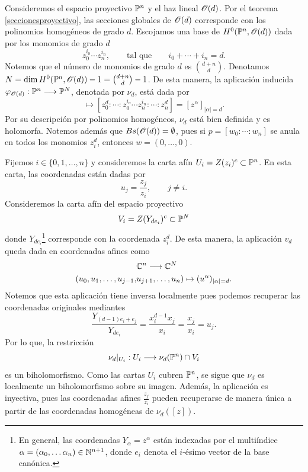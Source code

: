 	\begin{example}
		Consideremos el espacio proyectivo $\mathbb{P}^n$ y el haz lineal $\mathscr{O}(d)$. Por el teorema \ref{seccionesproyectivo}, las secciones globales de $\mathscr{O}(d)$ corresponde con los polinomios homogéneos de grado $d$. Escojamos una base de $H^0(\mathbb{P}^n,\mathscr{O}(d))$ dada por los monomios de grado $d$
		\begin{equation*}
			z_0^{i_0}\cdots z_n^{i_n},\qquad\text{tal que}\qquad i_0+\cdots+i_n=d.
		\end{equation*}
		Notemos que el número de monomios de grado $d$ es $\binom{d+n}{d}$. Denotamos $N=\dim H^0(\mathbb{P}^n,\mathscr{O}(d))-1=\binom{d+n}{d}-1$.
		De esta manera, la aplicación inducida $\varphi_{\mathscr{O}(d)}:\mathbb{P}^n\longrightarrow \mathbb{P}^N$, denotada por $\nu_d$, está dada por
		\begin{equation*}
			[z_0:\cdots:z_n]\mapsto [z_0^d:\cdots:z_0^{i_o}\cdots z_n^{i_n}:\cdots:z_n^d]=[z^\alpha]_{|\alpha|=d}.
		\end{equation*}
		Por su descripción por polinomios homogéneos, $\nu_d$ está bien definida y es holomorfa. 
		Notemos además que $Bs(\mathscr{O}(d))=\emptyset$, pues si $p=[w_0:\cdots:w_n]$ se anula en todos los monomios $z_i^d$, entonces $w=(0,\dots,0)$. 
		
		Fijemos $i\in\{0,1,\dots,n\}$ y consideremos la carta afín $U_i=Z(z_i)^c\subset \mathbb{P}^n$. En esta carta, las coordenadas están dadas por
		\begin{equation*}
			u_j=\frac{z_j}{z_i},\qquad j\neq i.
		\end{equation*}
		Consideremos la carta afín del espacio proyectivo 
		\begin{equation*}
			V_i=Z(Y_{de_i})^c\subset\mathbb{P}^N
		\end{equation*}
		donde $Y_{de_i}$\footnote{En general, las coordenadas $Y_\alpha=z^\alpha$ están indexadas por el multiíndice $\alpha=(\alpha_0,\dots \alpha_n)\in\mathbb{N}^{n+1}$, donde $e_i$ denota el $i$-ésimo vector de la base canónica.} corresponde con la coordenada $z_i^d$. De esta manera, la aplicación $v_d$ queda dada en coordenadas afines como
		\begin{align*}
			&\mathbb{C}^n\longrightarrow \mathbb{C}^N\\
			(u_0,u_1,\dots,u_{j-1},&u_{j+1},\dots,u_n)\mapsto (u^\alpha)_{|\alpha|=d}.
		\end{align*}
		Notemos que esta aplicación tiene inversa localmente pues podemos recuperar las coordenadas originales mediantes
		\begin{equation*}
			\frac{Y_{(d-1)e_i+e_j}}{Y_{de_i}}=\frac{x_i^{d-1}x_j}{x_i}=\frac{x_j}{x_i}=u_j.
		\end{equation*}
		Por lo que, la restricción
		\begin{equation*}
			\nu_d|_{U_i}:U_i\longrightarrow \nu_d(\mathbb{P}^n)\cap V_i
		\end{equation*}
		es un biholomorfismo. 
		Como las cartas $U_i$ cubren $\mathbb{P}^n$, se sigue que $\nu_d$ es localmente un biholomorfismo sobre su imagen. Además, la aplicación es inyectiva, pues las coordenadas afines $ \frac{z_j}{z_i}$ pueden recuperarse de manera única a partir de las coordenadas homogéneas de $\nu_d([z])$.
		

\end{example}
